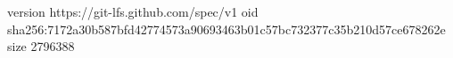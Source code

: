 version https://git-lfs.github.com/spec/v1
oid sha256:7172a30b587bfd42774573a90693463b01c57bc732377c35b210d57ce678262e
size 2796388
